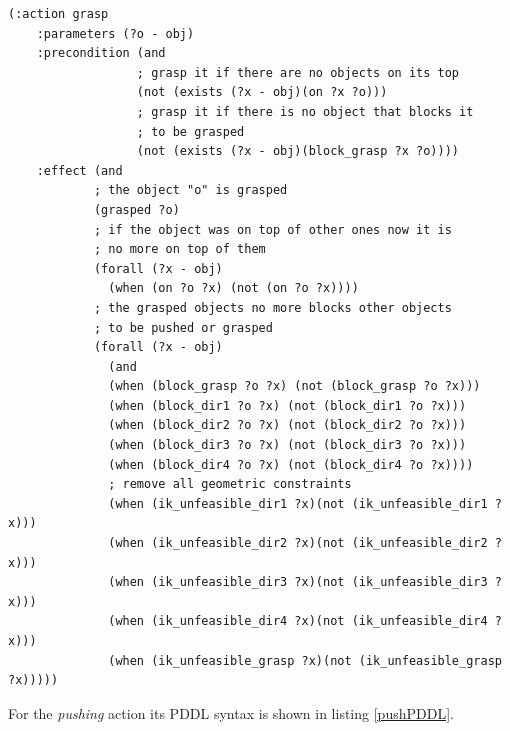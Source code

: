 \lstset{language=pddl}
\begin{lstlisting}[caption={PDDL syntax of the grasping action},label=graspPDDL]
(:action grasp
    :parameters (?o - obj)
    :precondition (and
                  ; grasp it if there are no objects on its top
                  (not (exists (?x - obj)(on ?x ?o)))
                  ; grasp it if there is no object that blocks it
                  ; to be grasped
                  (not (exists (?x - obj)(block_grasp ?x ?o))))
    :effect (and
            ; the object "o" is grasped
            (grasped ?o)
            ; if the object was on top of other ones now it is
            ; no more on top of them
            (forall (?x - obj)
              (when (on ?o ?x) (not (on ?o ?x))))
            ; the grasped objects no more blocks other objects 
            ; to be pushed or grasped
            (forall (?x - obj)
              (and
              (when (block_grasp ?o ?x) (not (block_grasp ?o ?x)))
              (when (block_dir1 ?o ?x) (not (block_dir1 ?o ?x)))
              (when (block_dir2 ?o ?x) (not (block_dir2 ?o ?x)))
              (when (block_dir3 ?o ?x) (not (block_dir3 ?o ?x)))
              (when (block_dir4 ?o ?x) (not (block_dir4 ?o ?x))))
              ; remove all geometric constraints 
              (when (ik_unfeasible_dir1 ?x)(not (ik_unfeasible_dir1 ?x)))
              (when (ik_unfeasible_dir2 ?x)(not (ik_unfeasible_dir2 ?x)))
              (when (ik_unfeasible_dir3 ?x)(not (ik_unfeasible_dir3 ?x)))
              (when (ik_unfeasible_dir4 ?x)(not (ik_unfeasible_dir4 ?x)))
              (when (ik_unfeasible_grasp ?x)(not (ik_unfeasible_grasp ?x)))))
\end{lstlisting}

For the \textit{pushing} action its PDDL syntax is shown in listing \ref{pushPDDL}.

